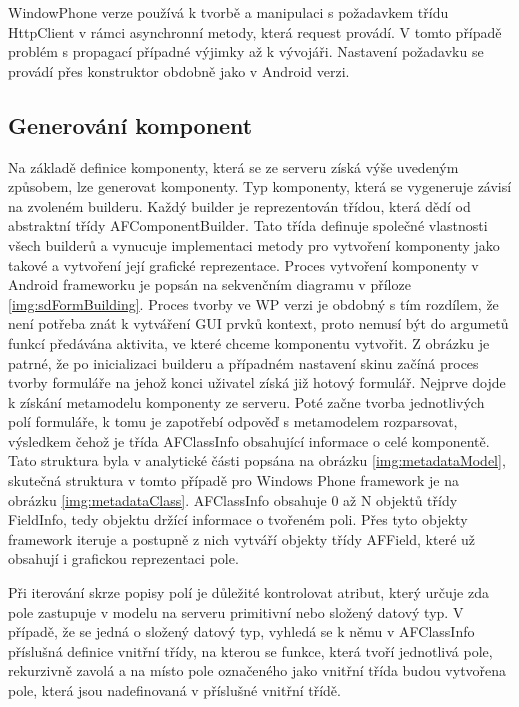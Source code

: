 WindowPhone verze používá k tvorbě a manipulaci s požadavkem třídu HttpClient \cite{wp-httpclient} v rámci asynchronní metody, která request provádí. V tomto případě problém s propagací případné výjimky až k vývojáři. Nastavení požadavku se provádí přes konstruktor obdobně jako v Android verzi. 

\subsection{Generování komponent}
Na základě definice komponenty, která se ze serveru získá výše uvedeným způsobem, lze generovat komponenty. Typ komponenty, která se vygeneruje závisí na zvoleném builderu. Každý builder je reprezentován třídou, která dědí od abstraktní třídy AFComponentBuilder. Tato třída definuje společné vlastnosti všech builderů a  vynucuje implementaci metody pro vytvoření komponenty jako takové a vytvoření její grafické reprezentace. Proces vytvoření komponenty v Android frameworku je popsán na sekvenčním diagramu v příloze \ref{img:sdFormBuilding}. Proces tvorby ve WP verzi je obdobný s tím rozdílem, že není potřeba znát k vytváření GUI prvků kontext, proto nemusí být do argumetů funkcí předávána aktivita, ve které chceme komponentu vytvořit. Z obrázku je patrné, že po inicializaci builderu a případném nastavení skinu začíná proces tvorby formuláře na jehož konci uživatel získá již hotový formulář. Nejprve dojde k získání metamodelu komponenty ze serveru. Poté začne tvorba jednotlivých polí formuláře, k tomu je zapotřebí odpověď s metamodelem rozparsovat, výsledkem čehož je třída AFClassInfo obsahující informace o celé komponentě. Tato struktura byla v analytické části popsána na obrázku \ref{img:metadataModel}, skutečná struktura v tomto případě pro Windows Phone framework je na obrázku \ref{img:metadataClass}. AFClassInfo obsahuje 0 až N objektů třídy FieldInfo, tedy objektu držící informace o tvořeném poli. Přes tyto objekty framework iteruje a postupně z nich vytváří objekty třídy AFField, které už obsahují i grafickou reprezentaci pole. 

Při iterování skrze popisy polí je důležité kontrolovat atribut, který určuje zda pole zastupuje v modelu na serveru primitivní nebo složený datový typ. V případě, že se jedná o složený datový typ, vyhledá se k němu v AFClassInfo příslušná definice vnitřní třídy, na kterou se funkce, která tvoří jednotlivá pole, rekurzivně zavolá a na místo pole označeného jako vnitřní třída budou vytvořena pole, která jsou nadefinovaná v příslušné vnitřní třídě. 

